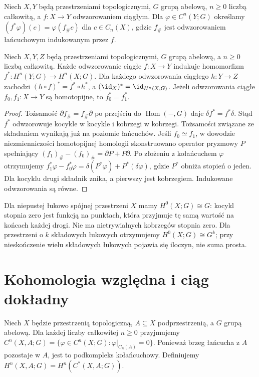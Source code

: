 \begin{definicja}
Niech $X,Y$ będą przestrzeniami topologicznymi,
$G$ grupą abelową, $n\geq0$ liczbą całkowitą,
a $f:X\to Y$ odwzorowaniem ciągłym. Dla $\varphi\in C^n(Y;G)$
określamy $(f^*\varphi)(c)=\varphi(f_\#c)$ dla $c\in C_n(X)$,
gdzie $f_\#$ jest odwzorowaniem łańcuchowym indukowanym przez $f$.
\end{definicja}

\begin{twierdzenie}
Niech $X,Y,Z$ będą przestrzeniami topologicznymi,
$G$ grupą abelową, a $n\geq0$ liczbą całkowitą.
Każde odwzorowanie ciągłe $f:X\to Y$ indukuje homomorfizm
$f^*:H^n(Y;G)\to H^n(X;G)$. Dla każdego odwzorowania
ciągłego $h:Y\to Z$ zachodzi $(h\circ f)^*=f^*\circ h^*$,
a $(\id_X)^*=\id_{H^n(X;G)}$.
Jeżeli odwzorowania ciągłe $f_0,f_1:X\to Y$
są homotopijne, to $f_0^*=f_1^*$.
\end{twierdzenie}
\begin{proof}
Tożsamość $\partial f_\#=f_\#\partial$ po przejściu do
$\operatorname{Hom}(-,G)$ daje $\delta f^*=f^*\delta$.
Stąd $f^*$ odwzorowuje kocykle w kocykle i kobrzegi w kobrzegi.
Tożsamości związane ze składaniem wynikają już na poziomie łańcuchów.
Jeśli $f_0\simeq f_1$, w dowodzie niezmienniczości homotopijnej
homologii skonstruowano operator pryzmowy $P$ spełniający
$(f_1)_\#-(f_0)_\#=\partial P+P\partial$.
Po złożeniu z kołańcuchem $\varphi$ otrzymujemy
$f_1^*\varphi-f_0^*\varphi=\delta(P^*\varphi)+P^*(\delta\varphi)$,
gdzie $P^*$ obniża stopień o jeden. Dla kocyklu drugi składnik znika,
a pierwszy jest kobrzegiem. Indukowane odwzorowania są równe.
\end{proof}

\begin{przyklad}
Dla niepustej łukowo spójnej przestrzeni $X$ mamy $H^0(X;G)\cong G$:
kocykl stopnia zero jest funkcją na punktach, która przyjmuje tę samą
wartość na końcach każdej drogi. Nie ma nietrywialnych kobrzegów
stopnia zero. Dla przestrzeni o $k$ składowych łukowych otrzymujemy
$H^0(X;G)\cong G^k$; przy nieskończenie wielu składowych
łukowych pojawia się iloczyn, nie suma prosta.
\end{przyklad}

\section{Kohomologia względna i ciąg dokładny}

\begin{definicja}
Niech $X$ będzie przestrzenią topologiczną, $A\subseteq X$
podprzestrzenią, a $G$ grupą abelową.
Dla każdej liczby całkowitej $n\geq0$ przyjmujemy
$C^n(X,A;G)=\{\varphi\in C^n(X;G):\varphi|_{C_n(A)}=0\}$.
Ponieważ brzeg łańcucha z $A$ pozostaje w $A$, jest to podkompleks
kołańcuchowy. Definiujemy $H^n(X,A;G)=H^n(C^*(X,A;G))$.
\end{definicja}

